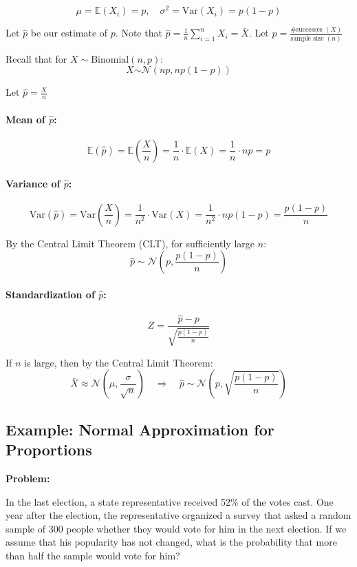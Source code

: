 \[
\mu = \mathbb{E}(X_i) = p, \quad \sigma^2 = \mathrm{Var}(X_i) = p(1 - p)
\]

Let $\hat{p}$ be our estimate of $p$. Note that $\hat{p} = \frac{1}{n} \sum_{i=1}^{n} X_i = \bar{X}$.
Let $\hat{p} = \frac{\text{\# successes } (X)}{\text{sample size } (n)}$

Recall that for $X \sim \text{Binomial}(n, p)$:
\[
X \overset{\cdot}{\sim} \mathcal{N}(np, np(1 - p))
\]

Let $\hat{p} = \frac{X}{n}$

\paragraph*{Mean of $\hat{p}$:}

\[
\mathbb{E}(\hat{p}) = \mathbb{E} \left( \frac{X}{n} \right) = \frac{1}{n} \cdot \mathbb{E}(X) = \frac{1}{n} \cdot np = p
\]

\paragraph*{Variance of $\hat{p}$:}

\[
\mathrm{Var}(\hat{p}) = \mathrm{Var} \left( \frac{X}{n} \right) = \frac{1}{n^2} \cdot \mathrm{Var}(X) = \frac{1}{n^2} \cdot np(1 - p) = \frac{p(1 - p)}{n}
\]

By the Central Limit Theorem (CLT), for sufficiently large $n$:
\[
\hat{p} \sim \mathcal{N} \left( p, \frac{p(1 - p)}{n} \right)
\]

\paragraph*{Standardization of $\hat{p}$:}
\[
Z = \frac{\hat{p} - p}{\sqrt{ \frac{p(1 - p)}{n} }}
\]

If $n$ is large, then by the Central Limit Theorem:
\[
\bar{X} \approx \mathcal{N} \left( \mu, \frac{\sigma}{\sqrt{n}} \right)
\quad \Rightarrow \quad
\hat{p} \sim \mathcal{N} \left( p, \sqrt{\frac{p(1 - p)}{n}} \right)
\]
\subsection*{Example: Normal Approximation for Proportions}

\textbf{Problem:}

In the last election, a state representative received 52\% of the votes cast. One year after the election, the representative organized a survey that asked a random sample of 300 people whether they would vote for him in the next election. If we assume that his popularity has not changed, what is the probability that more than half the sample would vote for him?

